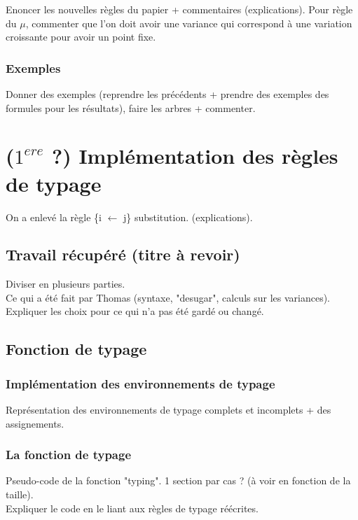\documentclass[11pt,a4paper]{article}
\begin{document}
Enoncer les nouvelles règles du papier + commentaires (explications). \color{red} Pour règle du $\mu$, commenter que l'on doit avoir une variance qui correspond à une variation croissante pour avoir un point fixe. \color{black}

\subsubsection{Exemples}

Donner des exemples (reprendre les précédents + prendre des exemples des formules pour les résultats), faire les arbres + commenter.

\section{($1^{ere}$ ?) Implémentation des règles de typage}

On a enlevé la règle \{i $\longleftarrow$ j\} substitution. (explications).


\subsection{Travail récupéré (titre à revoir)}

Diviser en plusieurs parties.
\\
Ce qui a été fait par Thomas (syntaxe, "desugar", calculs sur les variances). 
\\
Expliquer les choix pour ce qui n'a pas été gardé ou changé. 

\subsection{Fonction de typage}

\subsubsection{Implémentation des environnements de typage}

Représentation des environnements de typage complets et incomplets + des assignements. 

\subsubsection{La fonction de typage}

Pseudo-code de la fonction "typing". 
1 section par cas ? (à voir en fonction de la taille).
\\
Expliquer le code en le liant aux règles de typage réécrites. 
\end{document}
